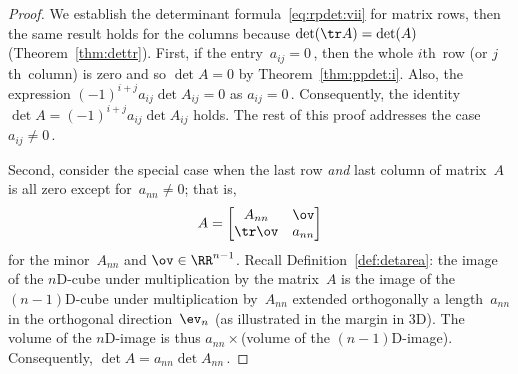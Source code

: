 \begin{proof} 
We establish the determinant formula~\eqref{eq:rpdet:vii} for matrix rows,  then the same result holds for the columns because \(\det(\tr A)=\det(A)\) (Theorem~\ref{thm:dettr}).
First, if the entry~\(a_{ij}=0\)\,, then the whole \(i\)th~row (or \(j\)th~column) is zero and so \(\det A=0\) by Theorem~\ref{thm:ppdet:i}.  
Also, the expression \((-1)^{i+j}a_{ij}\det A_{ij}=0\) as \(a_{ij}=0\)\,.  
Consequently, the identity \(\det A=(-1)^{i+j}a_{ij}\det A_{ij}\) holds.
The rest of this proof addresses the case \(a_{ij}\neq 0\)\,.

Second, consider the special case when the last row \emph{and} last column of matrix~\(A\) is all zero except for~\(a_{nn}\neq0\); that is, 
\begin{equation*}
A=\begin{bmatrix} A_{nn}&\ov\\\tr\ov&a_{nn} \end{bmatrix}
\end{equation*}
for the minor~\(A_{nn}\) and \(\ov\in\RR^{n-1}\).
Recall Definition~\ref{def:detarea}: the image of the \(n\)D-cube under multiplication by the matrix~\(A\) is the image of the \((n-1)\)D-cube under multiplication by~\(A_{nn}\) extended orthogonally a length~\(a_{nn}\) in the orthogonal direction~\(\ev_n\) (as illustrated in the margin in 3D).
The volume of the \(n\)D-image is thus \(a_{nn}\times{}\)(volume of the \((n-1)\)D-image).
Consequently, \(\det A=a_{nn}\det A_{nn}\)\,.
\begin{comment}
The above glosses over details for when \(a_{nn}<0\).
\end{comment}


\end{proof}
